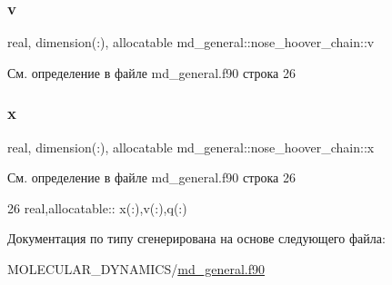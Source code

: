 \subsubsection{\texorpdfstring{v}{v}}
{\footnotesize\ttfamily real, dimension(\+:), allocatable md\+\_\+general\+::nose\+\_\+hoover\+\_\+chain\+::v}



См. определение в файле md\+\_\+general.\+f90 строка 26

\mbox{\label{structmd__general_1_1nose__hoover__chain_a5f4feaef1d5ac49538cefcd0596ca338}} 
\subsubsection{\texorpdfstring{x}{x}}
{\footnotesize\ttfamily real, dimension(\+:), allocatable md\+\_\+general\+::nose\+\_\+hoover\+\_\+chain\+::x}



См. определение в файле md\+\_\+general.\+f90 строка 26


\begin{DoxyCode}
26     \textcolor{keywordtype}{real},\textcolor{keywordtype}{allocatable}:: x(:),v(:),q(:)
\end{DoxyCode}


Документация по типу сгенерирована на основе следующего файла\+:\begin{DoxyCompactItemize}
\item 
M\+O\+L\+E\+C\+U\+L\+A\+R\+\_\+\+D\+Y\+N\+A\+M\+I\+C\+S/\mbox{\hyperlink{md__general_8f90}{md\+\_\+general.\+f90}}\end{DoxyCompactItemize}
